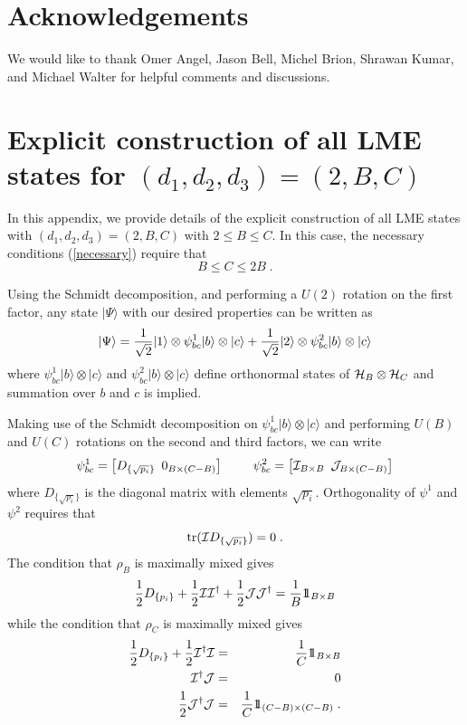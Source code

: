 \documentclass[12pt]{article}
\theoremstyle{definition}
\newcommand{\be}{\begin{equation}}
\newcommand{\ee}{\end{equation}}
\newcommand{\bea}{\begin{eqnarray}}
\newcommand{\eea}{\end{eqnarray}}
\def\identity{{\rlap{1} \hskip 1.6pt \hbox{1}}}
\newcommand{\tr}{{\rm tr}}
\begin{document}
\section*{Acknowledgements}

We would like to thank Omer Angel, Jason Bell, Michel Brion, Shrawan Kumar, and Michael Walter for helpful comments and discussions.

\appendix

\section{Explicit construction of all LME states for $(d_1,d_2,d_3) = (2,B,C)$}

In this appendix, we provide details of the explicit construction of all LME states with $(d_1, d_2, d_3) = (2,B,C)$ with $2 \le B \le C$. In this case, the necessary conditions (\ref{necessary}) require that
\be
B \le C \le 2 B \; .
\ee

Using the Schmidt decomposition, and performing a $U(2)$ rotation on the first factor, any state $|\Psi \rangle$ with our desired properties can be written as
\be
|\Psi \rangle = {1 \over \sqrt{2}} | 1 \rangle \otimes \psi^1_{bc} |b\rangle \otimes |c \rangle + {1 \over \sqrt{2}} | 2 \rangle \otimes \psi^2_{bc} |b\rangle \otimes |c \rangle
\ee
where $\psi^1_{bc} |b\rangle \otimes |c \rangle$ and $\psi^2_{bc} |b\rangle \otimes |c \rangle$ define orthonormal states of ${\cal H}_B \otimes {\cal H}_C$ and summation over $b$ and $c$ is implied.

Making use of the Schmidt decomposition on $\psi^1_{bc} |b\rangle \otimes |c \rangle$ and performing $U(B)$ and $U(C)$ rotations on the second and third factors, we can write
\be
\psi^1_{bc} = {\large \left[D_{\{\sqrt{p_i}\}} \, \, \,  0_{B \times (C-B)} \right] \qquad
\psi^2_{bc} = \left[{\cal I}_{B \times B} \, \, \, {\cal J}_{B \times (C-B)} \right]}
\ee
where $D_{\{\sqrt{p_i}\}}$ is the diagonal matrix with elements $\sqrt{p_i}$. Orthogonality of $\psi^1$ and $\psi^2$ requires that
\be
\label{cond1}
\tr({\cal I}D_{\{ \sqrt{p_i} \}}) = 0 \; .
\ee
The condition that $\rho_B$ is maximally mixed gives
\be
\label{cond2}
{1 \over 2} D_{\{p_i\}} + {1 \over 2} {\cal I} {\cal I}^\dagger + {1 \over 2} {\cal J} {\cal J}^\dagger = {1 \over B} \identity_{B \times B}
\ee
while the condition that $\rho_C$ is maximally mixed gives
\bea
\label{cond3}
{1 \over 2} D_{\{p_i\}} + {1 \over 2} {\cal I}^\dagger {\cal I}  &=& {1 \over C} \identity_{B \times B} \\
\label{cond4}
{\cal I}^\dagger {\cal J} &=& 0 \\
{1 \over 2} {\cal J}^\dagger {\cal J} &=& {1 \over C} \identity_{(C-B) \times (C-B)} \; .
\label{cond5}
\eea
\end{document}
